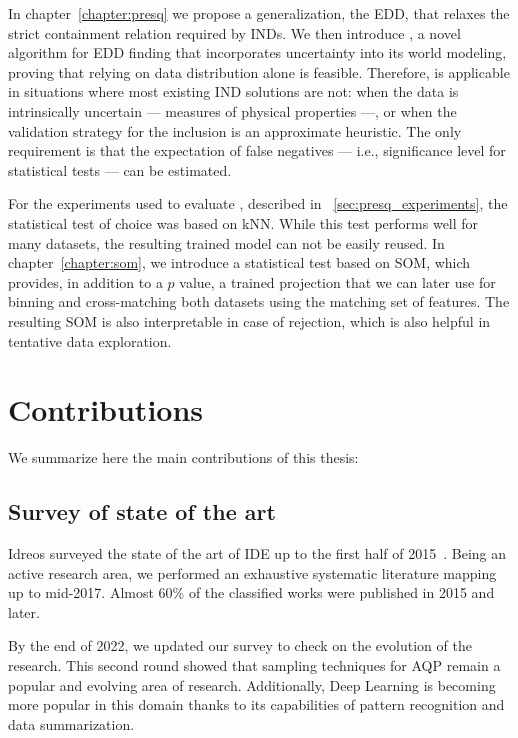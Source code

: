 In chapter~\ref{chapter:presq} we propose a generalization, the \gls{EDD}, that
relaxes the strict containment relation required by \glspl{IND}.
We then introduce \PresQ, a novel algorithm for \gls{EDD} finding that incorporates
uncertainty into its world modeling, proving that relying on data distribution alone is feasible.
Therefore, \PresQ is applicable in situations where most existing \gls{IND} solutions
are not: when the data is intrinsically uncertain --- measures of physical properties ---,
or when the validation strategy for the inclusion is an approximate heuristic.
The only requirement is that the expectation of false negatives --- i.e., significance
level for statistical tests --- can be estimated.

For the experiments used to evaluate \PresQ, described in ~\ref{sec:presq_experiments},
the statistical test of choice was based on \gls{kNN}. While this test
performs well for many datasets, the resulting trained model can not be easily reused.
In chapter~\ref{chapter:som}, we introduce a statistical test based on \gls{SOM}, which provides,
in addition to a $p$ value, a trained projection that we can later use for binning and
cross-matching both datasets using the matching set of features. The resulting \gls{SOM}
is also interpretable in case of rejection, which is also helpful in tentative data exploration.

\section{Contributions}
\label{sec:conclusions_contributions}

We summarize here the main contributions of this thesis:

\subsection{Survey of state of the art}
Idreos \etal surveyed the state of the art of \gls{IDE} up to the first half of 2015~\cite{Idreos2015}.
Being an active research area, we performed an exhaustive systematic literature mapping up to mid-2017.
Almost 60\% of the classified works were published in 2015 and later.

By the end of 2022, we updated our survey to check on the evolution of the research. This second
round showed that sampling techniques for \gls{AQP} remain a popular and evolving
area of research. Additionally, Deep Learning is becoming more popular in this domain thanks to its
capabilities of pattern recognition and data summarization.

